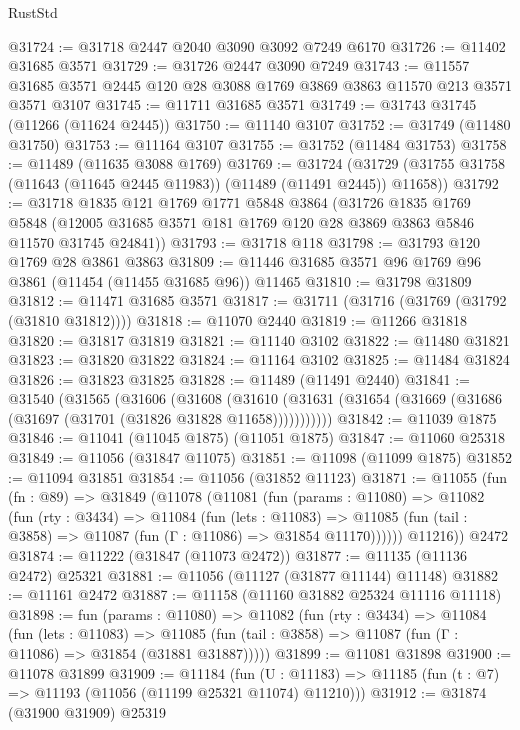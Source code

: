 \begin{lexlean}{RustStd}
\begin{coremodule}
@31724 := @31718 @2447 @2040 @3090 @3092 @7249 @6170
@31726 := @11402 @31685 @3571
@31729 := @31726 @2447 @3090 @7249
@31743 := @11557 @31685 @3571 @2445 @120 @28 @3088 @1769 @3869 @3863 @11570 @213 @3571 @3571 @3107
@31745 := @11711 @31685 @3571
@31749 := @31743 @31745 (@11266 (@11624 @2445))
@31750 := @11140 @3107
@31752 := @31749 (@11480 @31750)
@31753 := @11164 @3107
@31755 := @31752 (@11484 @31753)
@31758 := @11489 (@11635 @3088 @1769)
@31769 := @31724
    (@31729 (@31755 @31758 (@11643 (@11645 @2445 @11983)) (@11489 (@11491 @2445)) @11658))
@31792 := @31718
    @1835
    @121
    @1769
    @1771
    @5848
    @3864
    (@31726
      @1835
      @1769
      @5848
      (@12005 @31685 @3571 @181 @1769 @120 @28 @3869 @3863 @5846 @11570 @31745 @24841))
@31793 := @31718 @118
@31798 := @31793 @120 @1769 @28 @3861 @3863
@31809 := @11446 @31685 @3571 @96 @1769 @96 @3861 (@11454 (@11455 @31685 @96)) @11465
@31810 := @31798 @31809
@31812 := @11471 @31685 @3571
@31817 := @31711 (@31716 (@31769 (@31792 (@31810 @31812))))
@31818 := @11070 @2440
@31819 := @11266 @31818
@31820 := @31817 @31819
@31821 := @11140 @3102
@31822 := @11480 @31821
@31823 := @31820 @31822
@31824 := @11164 @3102
@31825 := @11484 @31824
@31826 := @31823 @31825
@31828 := @11489 (@11491 @2440)
@31841 := @31540
    (@31565
      (@31606
        (@31608
          (@31610 (@31631 (@31654 (@31669 (@31686 (@31697 (@31701 (@31826 @31828 @11658)))))))))))
@31842 := @11039 @1875
@31846 := @11041 (@11045 @1875) (@11051 @1875)
@31847 := @11060 @25318
@31849 := @11056 (@31847 @11075)
@31851 := @11098 (@11099 @1875)
@31852 := @11094 @31851
@31854 := @11056 (@31852 @11123)
@31871 := @11055
    (fun (fn : @89) =>
    @31849
      (@11078
        (@11081
          (fun (params : @11080) =>
          @11082
            (fun (rty : @3434) =>
            @11084
              (fun (lets : @11083) =>
              @11085 (fun (tail : @3858) => @11087 (fun (Γ : @11086) => @31854 @11170))))))
        @11216))
    @2472
@31874 := @11222 (@31847 (@11073 @2472))
@31877 := @11135 (@11136 @2472) @25321
@31881 := @11056 (@11127 (@31877 @11144) @11148)
@31882 := @11161 @2472
@31887 := @11158 (@11160 @31882 @25324 @11116 @11118)
@31898 := fun (params : @11080) =>
  @11082
    (fun (rty : @3434) =>
    @11084
      (fun (lets : @11083) =>
      @11085 (fun (tail : @3858) => @11087 (fun (Γ : @11086) => @31854 (@31881 @31887)))))
@31899 := @11081 @31898
@31900 := @11078 @31899
@31909 := @11184
    (fun (U : @11183) => @11185 (fun (t : @7) => @11193 (@11056 (@11199 @25321 @11074) @11210)))
@31912 := @31874 (@31900 @31909) @25319

\end{coremodule}
\end{lexlean}
